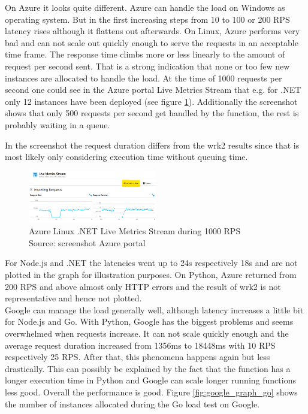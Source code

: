 On Azure it looks quite different. Azure can handle the load on Windows as operating system. But in the first increasing steps from 10 to 100 or 200 RPS latency rises although it flattens out afterwards. On Linux, Azure performs very bad and can not scale out quickly enough to serve the requests in an acceptable time frame. The response time climbs more or less linearly to the amount of request per second sent. That is a strong indication that none or too few new instances are allocated to handle the load. At the time of 1000 requests per second one could see in the Azure portal Live Metrics Stream that e.g. for .NET only 12 instances have been deployed (see figure \ref{fig:live_metrics_stream}). Additionally the screenshot shows that only 500 requests per second get handled by the function, the rest is probably waiting in a queue.
\begin{remark}
In the screenshot the request duration differs from the wrk2 results since that is most likely only considering execution time without queuing time.
\end{remark}

\begin{figure}[htp]
\begin{center}
\includegraphics[width=0.5\textwidth]{bilder/Azure_Dotnet_1000.png}
\captionsetup{justification=centering, labelfont=bf}
\caption[Azure Linux .NET Live Metrics Stream during 1000 RPS]{Azure Linux .NET Live Metrics Stream during 1000 RPS\\Source: screenshot Azure portal}
\label{fig:live_metrics_stream}
\end{center}
\end{figure}

For Node.js and .NET the latencies went up to 24s respectively 18s and are not plotted in the graph for illustration purposes. On Python, Azure returned from 200 \gls{RPS} and above almost only \gls{HTTP} errors and the result of wrk2 is not representative and hence not plotted.\\
Google can manage the load generally well, although latency increases a little bit for Node.js and Go. With Python, Google has the biggest problems and seems overwhelmed when requests increase. It can not scale quickly enough and the average request duration increased from 1356ms to 18448ms with 10 \gls{RPS} respectively 25 \gls{RPS}. After that, this phenomena happens again but less drastically. This can possibly be explained by the fact that the function has a longer execution time in Python and Google can scale longer running functions less good. Overall the performance is good. Figure \ref{fig:google_graph_go} shows the number of instances allocated during the Go load test on Google.

